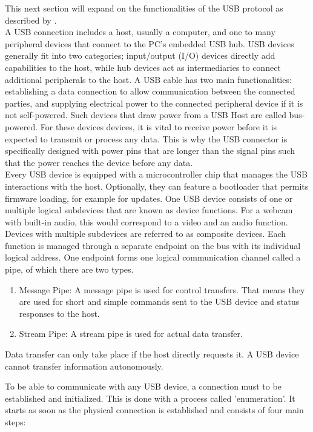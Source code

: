 This next section will expand on the functionalities of the USB protocol as described by \cite{nissimUSBbasedAttacks2017}. \\
A USB connection includes a host, usually a computer, and one to many peripheral devices that connect to the PC's embedded USB hub. USB devices generally fit into two categories; input/output (I/O) devices directly add capabilities to the host, while hub devices act as intermediaries to connect additional peripherals to the host. A USB cable has two main functionalities: establishing a data connection to allow communication between the connected parties, and supplying electrical power to the connected peripheral device if it is not self-powered. Such devices that draw power from a USB Host are called bus-powered. For these devices devices, it is vital to receive power before it is expected to transmit or process any data. This is why the USB connector is specifically designed with power pins that are longer than the signal pins such that the power reaches the device before any data.\\
Every USB device is equipped with a microcontroller chip that manages the USB interactions with the host. Optionally, they can feature a bootloader that permits firmware loading, for example for updates. One USB device consists of one or multiple logical subdevices that are known as device functions. For a webcam with built-in audio, this would correspond to a video and an audio function. Devices with multiple subdevices are referred to as composite devices. Each function is managed through a separate endpoint on the bus with its individual logical address. One endpoint forms one logical communication channel called a pipe, of which there are two types.  
\begin{enumerate}
    \item Message Pipe: A message pipe is used for control transfers. That means they are used for short and simple commands sent to the USB device and status responses to the host.
    \item Stream Pipe: A stream pipe is used for actual data transfer.
\end{enumerate}
Data transfer can only take place if the host directly requests it. A USB device cannot transfer information autonomously. 

To be able to communicate with any USB device, a connection must to be established and initialized. This is done with a process called 'enumeration'. It starts as soon as the physical connection is established and consists of four main steps:

